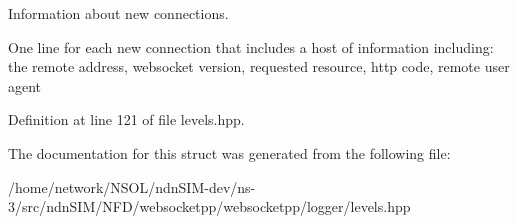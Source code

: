 Information about new connections. 

One line for each new connection that includes a host of information including\+: the remote address, websocket version, requested resource, http code, remote user agent 

Definition at line 121 of file levels.\+hpp.



The documentation for this struct was generated from the following file\+:\begin{DoxyCompactItemize}
\item 
/home/network/\+N\+S\+O\+L/ndn\+S\+I\+M-\/dev/ns-\/3/src/ndn\+S\+I\+M/\+N\+F\+D/websocketpp/websocketpp/logger/levels.\+hpp\end{DoxyCompactItemize}
